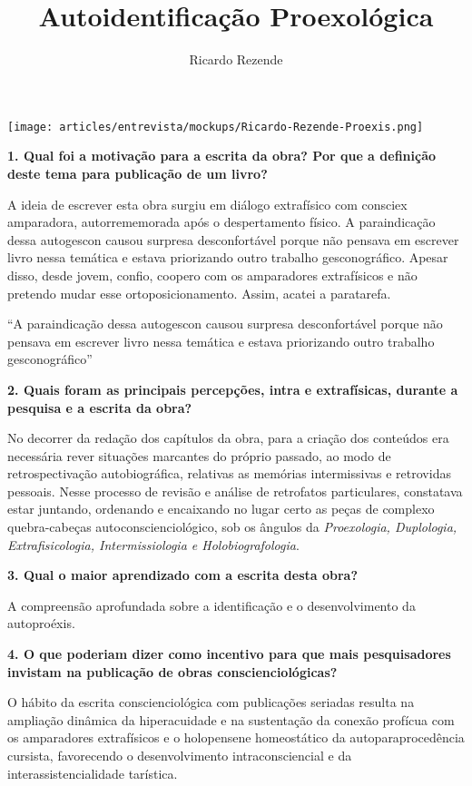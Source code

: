 \documentclass{gescons}
\author{Ricardo Rezende}
\title{Autoidentificação Proexológica}
\begin{document}
    \makeentrevistatitle

    \begin{multicols}{2}


\begin{center}
    \texttt{[image: articles/entrevista/mockups/Ricardo-Rezende-Proexis.png]}
\end{center}

\textbf{1. Qual foi a motivação para a escrita da obra? Por que a definição deste tema para publicação de um livro? }

A ideia de escrever esta obra surgiu em diálogo extrafísico com consciex amparadora, autorrememorada após o despertamento físico. A paraindicação dessa autogescon causou surpresa desconfortável porque não pensava em escrever livro nessa temática e estava priorizando outro trabalho gesconográfico. Apesar disso, desde jovem, confio, coopero com os amparadores extrafísicos e não pretendo mudar esse ortoposicionamento. Assim, acatei a paratarefa.

\begin{pullquote}
    ``A paraindicação dessa autogescon causou surpresa desconfortável porque não pensava em escrever livro nessa temática e estava priorizando outro trabalho gesconográfico''
\end{pullquote}

\textbf{2. Quais foram as principais percepções, intra e extrafísicas, durante a pesquisa e a escrita da obra? }

No decorrer da redação dos capítulos da obra, para a criação dos conteúdos era necessária rever situações marcantes do próprio passado, ao modo de retrospectivação autobiográfica, relativas as memórias intermissivas e retrovidas pessoais. Nesse processo de revisão e análise de retrofatos particulares, constatava estar juntando, ordenando e encaixando no lugar certo as peças de complexo quebra-cabeças autoconscienciológico, sob os ângulos da \textit{Proexologia, Duplologia, Extrafisicologia, Intermissiologia e Holobiografologia}.

\textbf{3. Qual o maior aprendizado com a escrita desta obra? }

A compreensão aprofundada sobre a identificação e o desenvolvimento da autoproéxis.

\textbf{4. O que poderiam dizer como incentivo para que mais pesquisadores invistam na publicação de obras conscienciológicas?}

O hábito da escrita conscienciológica com publicações seriadas resulta na ampliação dinâmica da hiperacuidade e na sustentação da conexão profícua com os amparadores extrafísicos e o holopensene homeostático da autoparaprocedência cursista, favorecendo o desenvolvimento intraconsciencial e da interassistencialidade tarística.


\end{multicols}
\end{document}
